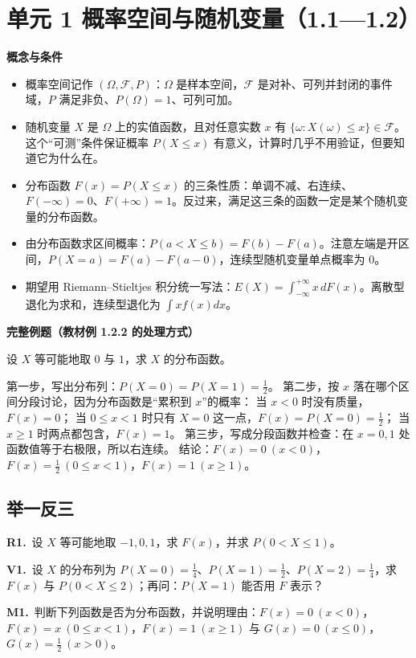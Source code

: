\documentclass[UTF8,a4paper,11pt]{ctexart}
\newcommand{\PracticeQuestion}[3]{\par\Needspace{4\baselineskip}\noindent\begin{minipage}{\linewidth}\textbf{#1.}\ #2\par\noindent\rule{0pt}{#3mm}\par\end{minipage}\par}
\begin{document}
\clearpage
{}
\section{单元 1 概率空间与随机变量（1.1—1.2）}
\textbf{概念与条件}

\begin{itemize}
\item 概率空间记作 $(\Omega,\mathcal{F},P)$：$\Omega$ 是样本空间，$\mathcal{F}$ 是对补、可列并封闭的事件域，$P$ 满足非负、$P(\Omega)=1$、可列可加。
\item 随机变量 $X$ 是 $\Omega$ 上的实值函数，且对任意实数 $x$ 有 $\{\omega:X(\omega)\le x\}\in\mathcal{F}$。这个“可测”条件保证概率 $P(X\le x)$ 有意义，计算时几乎不用验证，但要知道它为什么在。
\item 分布函数 $F(x)=P(X\le x)$ 的三条性质：单调不减、右连续、$F(-\infty)=0$、$F(+\infty)=1$。反过来，满足这三条的函数一定是某个随机变量的分布函数。
\item 由分布函数求区间概率：$P(a<X\le b)=F(b)-F(a)$。注意左端是开区间，$P(X=a)=F(a)-F(a-0)$，连续型随机变量单点概率为 0。
\item 期望用 Riemann–Stieltjes 积分统一写法：$E(X)=\int_{-\infty}^{+\infty}x\,dF(x)$。离散型退化为求和，连续型退化为 $\int x f(x)dx$。
\end{itemize}
\textbf{完整例题（教材例 1.2.2 的处理方式）}

设 $X$ 等可能地取 $0$ 与 $1$，求 $X$ 的分布函数。

第一步，写出分布列：$P(X=0)=P(X=1)=\frac12$。 第二步，按 $x$ 落在哪个区间分段讨论，因为分布函数是“累积到 $x$”的概率： 当 $x<0$ 时没有质量，$F(x)=0$； 当 $0\le x<1$ 时只有 $X=0$ 这一点，$F(x)=P(X=0)=\frac12$； 当 $x\ge 1$ 时两点都包含，$F(x)=1$。 第三步，写成分段函数并检查：在 $x=0,1$ 处函数值等于右极限，所以右连续。 结论：$F(x)=0\ (x<0)$，$F(x)=\frac12\ (0\le x<1)$，$F(x)=1\ (x\ge 1)$。

\subsection{举一反三}
\PracticeQuestion{R1}{设 $X$ 等可能地取 $-1,0,1$，求 $F(x)$，并求 $P(0<X\le 1)$。}{42}
\PracticeQuestion{V1}{设 $X$ 的分布列为 $P(X=0)=\frac14$、$P(X=1)=\frac12$、$P(X=2)=\frac14$，求 $F(x)$ 与 $P(0<X\le 2)$；再问：$P(X=1)$ 能否用 $F$ 表示？}{30}
\PracticeQuestion{M1}{判断下列函数是否为分布函数，并说明理由：$F(x)=0\ (x<0)$，$F(x)=x\ (0\le x<1)$，$F(x)=1\ (x\ge 1)$ 与 $G(x)=0\ (x\le 0)$，$G(x)=\frac12\ (x>0)$。}{40}
\clearpage
{}
\end{document}
